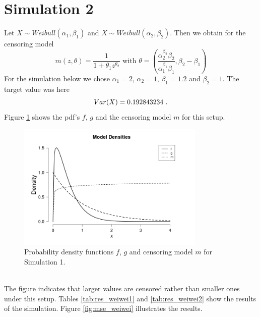 \section{Simulation 2} \label{sec:sim_weiwei}
Let $X \sim Weibull(\alpha_1, \beta_1)$ and  $X \sim Weibull(\alpha_2, \beta_2)$.
Then we obtain for the censoring model 
$$m(z,\theta) = \frac{1}{1+\theta_1 z^{\theta_2}} \textrm{ with } \theta = \left(\frac{\alpha_2^{\beta_2}\beta_2}{\alpha_1^{\beta_1}\beta_1}, \beta_2 - \beta_1\right)$$
%
For the simulation below we chose $\alpha_1 = 2$, $\alpha_2 = 1$, $\beta_1 = 1.2$ and $\beta_2 = 1$. The target value was here
$$Var(X) = 0.192843234\textrm{ .}$$
Figure \ref{fig:dens_wei_wei} shows the pdf's $f$, $g$ and the censoring model $m$ for this setup.\\
\begin{figure}[h!]
	\begin{center}
		\includegraphics[width=0.8\textwidth]{./figures/wei_wei_dens2}
	\end{center}
	\caption{Probability density functions $f$, $g$ and censoring model $m$ for Simulation 1.}
	\label{fig:dens_wei_wei}
\end{figure}\\
The figure indicates that larger values are censored rather than smaller ones under this setup. Tables \ref{tab:res_weiwei1} and \ref{tab:res_weiwei2} show the results of the simulation. Figure \ref{fig:mse_weiwei} illustrates the results.\\
\clearpage
%
